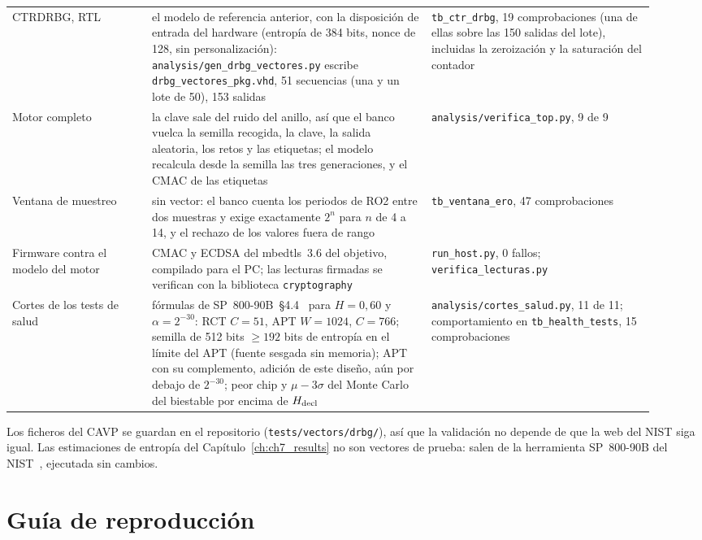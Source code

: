 \begin{table}[htbp]
\begin{tabular}{@{}>{\raggedright\arraybackslash}p{0.2\linewidth}>{\raggedright\arraybackslash}p{0.4\linewidth}>{\raggedright\arraybackslash}p{0.32\linewidth}@{}}
\ac{CTRDRBG}, \ac{RTL} & el modelo de referencia anterior, con la
  disposición de entrada del hardware (entropía de 384 bits, nonce de 128,
  sin personalización): \nolinkurl{analysis/gen_drbg_vectores.py} escribe
  \texttt{drbg\_vectores\_pkg.vhd}, 51 secuencias (una y un lote de 50),
  153 salidas & \texttt{tb\_ctr\_drbg}, 19
  comprobaciones (una de ellas sobre las 150 salidas del lote),
  incluidas la zeroización y la saturación del contador \\
Motor completo & la clave sale del ruido del anillo, así que el banco
  vuelca la semilla recogida, la clave, la salida aleatoria, los retos y
  las etiquetas; el modelo recalcula desde la semilla las tres
  generaciones, y el \ac{CMAC} de las etiquetas &
  \nolinkurl{analysis/verifica_top.py}, 9 de 9 \\
Ventana de muestreo & sin vector: el banco cuenta los periodos de RO2
  entre dos muestras y exige exactamente $2^{n}$ para $n$ de 4 a 14, y el
  rechazo de los valores fuera de rango & \texttt{tb\_ventana\_ero}, 47
  comprobaciones \\
Firmware contra el modelo del motor & \ac{CMAC} y ECDSA del mbedtls~3.6
  del objetivo, compilado para el PC; las lecturas firmadas se verifican
  con la biblioteca \texttt{cryptography} & \texttt{run\_host.py}, 0 fallos;
  \texttt{verifica\_lecturas.py} \\
Cortes de los tests de salud & fórmulas de
  SP~800-90B~\S4.4~\cite{turan_2018_sp80090b} para $H = 0{,}60$ y
  $\alpha = 2^{-30}$: \ac{RCT} $C = 51$, \ac{APT} $W = 1024$, $C = 766$;
  semilla de 512 bits $\ge 192$ bits de entropía en el límite del
  \ac{APT} (fuente sesgada sin memoria); \ac{APT} con su complemento,
  adición de este diseño, aún por debajo de $2^{-30}$;
  peor chip y $\mu - 3\sigma$ del Monte Carlo del biestable por encima de
  $H_{\mathrm{decl}}$ &
  \nolinkurl{analysis/cortes_salud.py}, 11 de 11; comportamiento en
  \texttt{tb\_health\_tests}, 15 comprobaciones \\
\bottomrule
\end{tabular}
\end{table}

Los ficheros del \ac{CAVP} se guardan en el repositorio
(\nolinkurl{tests/vectors/drbg/}), así que la validación no depende de que la
web del \ac{NIST} siga igual. Las estimaciones de entropía del
Capítulo~\ref{ch:ch7_results} no son vectores de prueba: salen de la
herramienta SP~800-90B del \ac{NIST}~\cite{nist_ea_github}, ejecutada sin
cambios.

\chapter{Guía de reproducción}
\label{app:repro}

